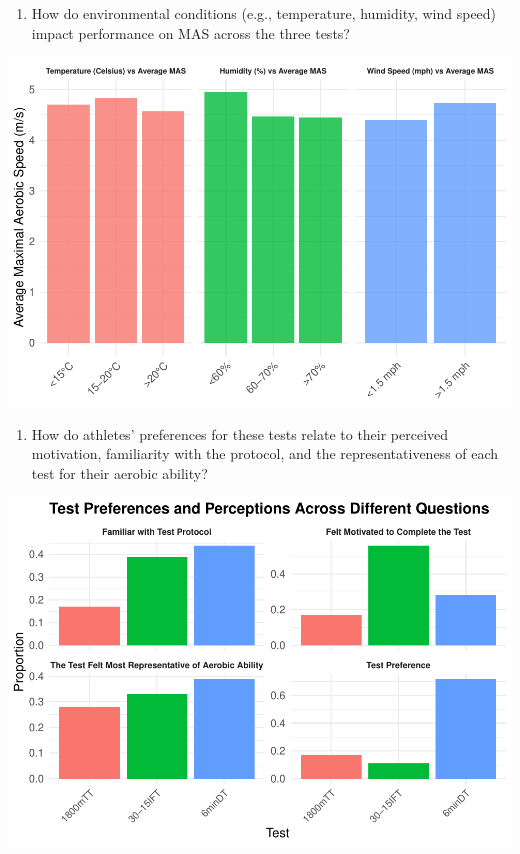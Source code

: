 \documentclass[
  man]{apa6}
\providecommand{\tightlist}{%
  \setlength{\itemsep}{0pt}\setlength{\parskip}{0pt}}
\begin{document}
\begin{enumerate}
\def\labelenumi{\arabic{enumi}.}
\setcounter{enumi}{1}
\tightlist
\item
  How do environmental conditions (e.g., temperature, humidity, wind speed) impact performance on MAS across the three tests?
\end{enumerate}

\includegraphics{FinalProject_files/figure-latex/plot 3-1.pdf}
\clearpage

\begin{enumerate}
\def\labelenumi{\arabic{enumi}.}
\setcounter{enumi}{2}
\tightlist
\item
  How do athletes' preferences for these tests relate to their perceived motivation, familiarity with the protocol, and the representativeness of each test for their aerobic ability?
\end{enumerate}

\includegraphics{FinalProject_files/figure-latex/plot 4-1.pdf}
\clearpage
\end{document}
